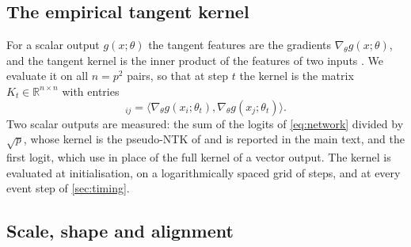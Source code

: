 \documentclass[a4paper,11pt]{article} %
\begin{document}
\subsection{The empirical tangent kernel}

For a scalar output $g(x;\theta)$ the tangent features are the gradients
$\nabla_\theta g(x;\theta)$, and the tangent kernel is the inner product of the
features of two inputs
\citep{jacotNeuralTangentKernel2020,baratinImplicitRegularizationNeural2021}.
We evaluate it on all $n=p^2$ pairs, so that at step $t$ the kernel is the
matrix $K_t\in\mathbb{R}^{n\times n}$ with entries
\begin{equation}
  [K_t]_{ij} = \bigl\langle\nabla_\theta g(x_i;\theta_t),
  \nabla_\theta g(x_j;\theta_t)\bigr\rangle .
\end{equation}
Two scalar outputs are measured: the sum of the logits
of \eqref{eq:network} divided by $\sqrt{p}$, whose kernel is the pseudo-NTK of
\citet{mohamadiFastWellFoundedApproximation2022} and is reported in the main
text, and the first logit, which \citet{mohamadiWhyYouGrok2024} use in place of
the full kernel of a vector output. The kernel is evaluated at
initialisation, on a
logarithmically spaced grid of steps, and at every event step of
\cref{sec:timing}.

\subsection{Scale, shape and alignment}
\label{sec:statistics}
\end{document}
